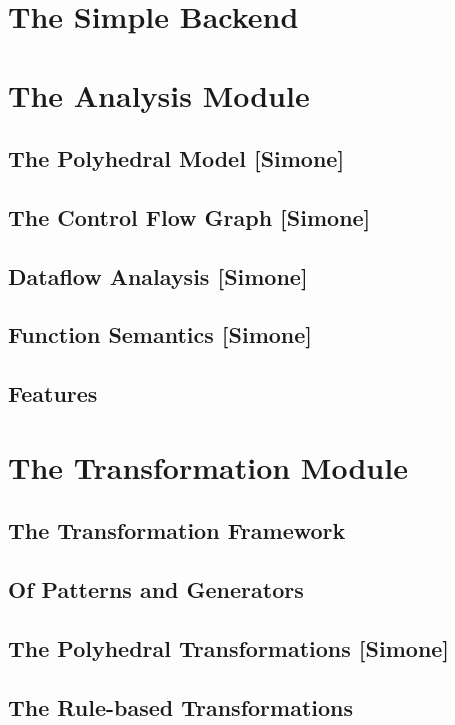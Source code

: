 \section{The Simple Backend}

\section{The Analysis Module}
\subsection{The Polyhedral Model [Simone]}
\subsection{The Control Flow Graph [Simone]}
\subsection{Dataflow Analaysis [Simone]}
\subsection{Function Semantics [Simone]}
\subsection{Features}

\section{The Transformation Module}
\subsection{The Transformation Framework}
\subsection{Of Patterns and Generators}
\label{sec:Compiler.Transform.Pattern}
\subsection{The Polyhedral Transformations [Simone]}
\subsection{The Rule-based Transformations}



